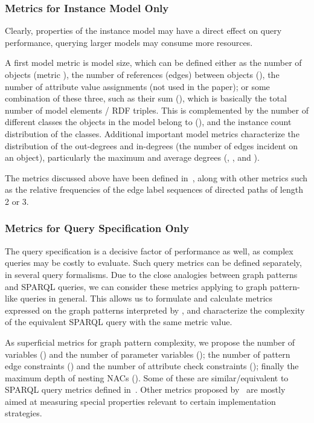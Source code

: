 \subsubsection{Metrics for Instance Model Only}
Clearly, properties of the instance model may have a direct effect on query
performance, \eg querying larger models may consume  more resources.

A first model metric is model size, which can be defined either as the
number of objects (metric ), the number of references (edges)
between objects (), the number of attribute value assignments
(not used in the paper);
or some combination of
these three, such as their sum (), which is basically the
total number of model elements / RDF triples. This is complemented by the number
of different classes the objects in the model belong to (), and
the instance count distribution of the classes. %
Additional important model metrics characterize the distribution of the
out-degrees and in-degrees (the number of edges incident on an object),
particularly the maximum and average degrees (,
,  and ).
 
The metrics discussed above have been defined \eg in~\cite{COLD2012-analysis-DBLP:conf/semweb/StarkaSM12}, along with other
metrics such as the relative frequencies of the edge label sequences of directed
paths of length 2 or 3.
 
\subsubsection{Metrics for Query Specification Only}
The query specification is a decisive factor of performance as well, as complex
queries may be costly to evaluate. Such query metrics can be defined separately,
in several query formalisms. Due to the
close analogies between graph patterns and SPARQL queries, we can consider these
metrics applying to graph pattern-like queries in general. This allows us to
formulate and calculate metrics expressed on the graph patterns interpreted by
\eiq, and characterize the complexity of the equivalent SPARQL query with
the same metric value.

As superficial metrics for graph pattern complexity, we propose the number of
variables () and the number of parameter variables
(); the number of pattern edge constraints
() and the number of attribute check constraints
(); finally the maximum depth of nesting NACs
(). Some of these are similar/equivalent to 
SPARQL query metrics defined in~\cite{SPLODGE}. Other metrics proposed
by~\cite{SPLODGE} are mostly aimed at measuring special properties relevant to
certain implementation strategies.

